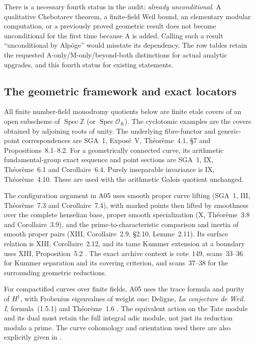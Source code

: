 \documentclass[11pt,a4paper]{article}
\begin{document}
There is a necessary fourth status in the audit: \emph{already
unconditional}. A qualitative Chebotarev theorem, a finite-field
Weil bound, an elementary modular computation, or a previously proved
geometric result does not become unconditional for the first time
because A is added. Calling such a result ``unconditional by Alp\"oge''
would misstate its dependency. The row tables retain the requested
A-only/M-only/beyond-both distinctions for actual analytic upgrades,
and this fourth status for existing statements.

\subsection{The geometric framework and exact locators}

All finite number-field monodromy quotients below are finite etale
covers of an open subscheme of $\operatorname{Spec}\mathbb Z$ (or
$\operatorname{Spec}\mathcal O_K$). The cyclotomic examples are the
covers obtained by adjoining roots of unity. The underlying
fibre-functor and generic-point correspondences are SGA~1,
Expos\'e~V, Th\'eor\`eme~4.1, \S7 and Propositions~8.1--8.2.
For a geometrically connected curve, its arithmetic fundamental-group
exact sequence and point sections are SGA~1, IX, Th\'eor\`eme~6.1
and Corollaire~6.4. Purely inseparable invariance is IX,
Th\'eor\`eme~4.10. These are used with the arithmetic Galois quotient
unchanged.

The configuration argument in A05 uses smooth proper curve lifting
(SGA~1, III, Th\'eor\`eme~7.3 and Corollaire~7.4), with marked
points then lifted by smoothness over the complete henselian base,
proper smooth
specialization (X, Th\'eor\`eme~3.8 and Corollaire~3.9), and the
prime-to-characteristic comparison and inertia of smooth proper pairs
(XIII, Corollaire~2.9, \S2.10, Lemme~2.11). Its surface relation is
XIII, Corollaire~2.12, and its tame Kummer extension at a boundary
uses XIII, Proposition~5.2 \cite{SGA1}. The exact archive context is
cote~149, scans~33--36 for Kummer separation and its covering
criterion, and scans~37--38 for the surrounding geometric reductions.

For compactified curves over finite fields, A05 uses the trace
formula and purity of $H^1$, with Frobenius eigenvalues of weight one:
Deligne, \emph{La conjecture de Weil. I}, formula~(1.5.1) and
Th\'eor\`eme~1.6 \cite{WeilI}. The equivalent action on the
Tate module and its dual must retain the full integral adic module,
not just its reduction modulo a prime. The curve cohomology and
orientation used there are also explicitly given in
\cite[Proposition~14.2 and Remark~14.10]{MilneLEC}.
\end{document}
